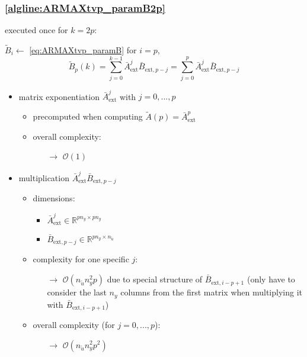 \documentclass{article}
\begin{document}
\subsubsection{\cref{algline:ARMAXtvp_paramB2p}} \label{sec:line10}
executed once for $k=2p$:

$\tilde{B}_i \gets$ \cref{eq:ARMAXtvp_paramB}{ \small for $i=p$,} 
$$\tilde{B}_{p}(k) =  \sum_{j=0}^{k-1} \bar{A}_\text{ext}^{j} \bar{B}_{\text{ext},p-j} = \sum_{j=0}^{p} \bar{A}_\text{ext}^{j} \bar{B}_{\text{ext},p-j} $$
\begin{itemize}
    \item matrix exponentiation $\bar{A}_\text{ext}^{j}$ with $j=0,...,p$
    \begin{itemize}
        \item precomputed when computing $\tilde{A}(p)=\bar{A}_\text{ext}^{p}$
        \item overall complexity:
        \begin{itemize}
            \item[$\rightarrow$] $\mathcal{O}(1)$
        \end{itemize}
    \end{itemize}
    \item multiplication $\bar{A}_\text{ext}^{j} \bar{B}_{\text{ext},p-j}$ 
    \begin{itemize}
        \item dimensions:
        \begin{itemize}
            \item $\bar{A}_\text{ext}^j \in \mathbb{R}^{pn_y \times pn_y}$
            \item $\bar{B}_{\text{ext},p-j} \in \mathbb{R}^{pn_y \times n_{\tilde{u}}}$
        \end{itemize}        
        \item complexity for one specific $j$:
        \begin{itemize}
            \item[$\rightarrow$] $\mathcal{O}(n_{\tilde{u}} n_y^2 p)$ due to special structure of $\bar{B}_{\text{ext},i-p+1}$ (only have to consider the last $n_y$ columns from the first matrix when multiplying it with $\bar{B}_{\text{ext},i-p+1}$)
        \end{itemize} 
        \item overall complexity (for $j=0,...,p$):
        \begin{itemize}
            \item[$\rightarrow$] $\mathcal{O}(n_{\tilde{u}} n_y^2 p^2)$

\end{itemize}
\end{itemize}
\end{itemize}
\end{document}
